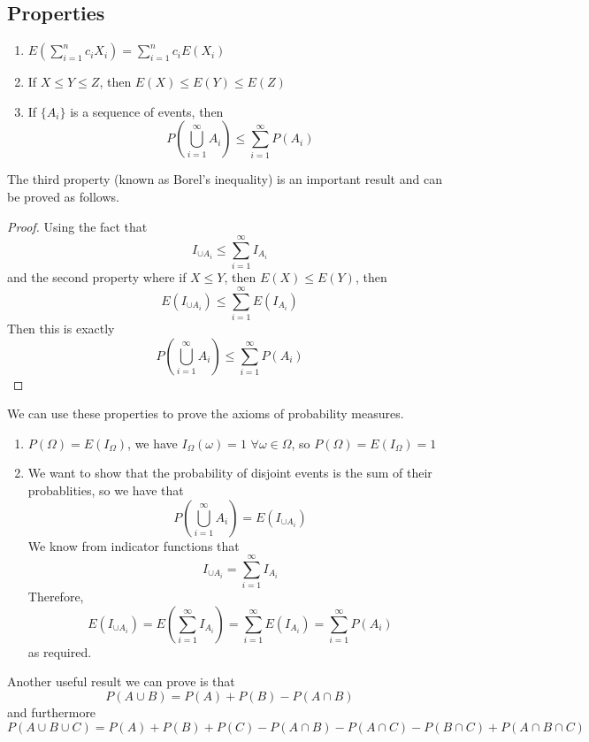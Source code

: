 \documentclass[openany]{report}
\begin{document}
\subsection{Properties}
\begin{enumerate}
    \item $E\left(\sum\limits_{i=1}^n c_iX_i\right) = \sum\limits_{i=1}^n c_iE(X_i)$
    \item If $X \leq Y \leq Z$, then $E(X) \leq E(Y) \leq E(Z)$
    \item If $\{A_i\}$ is a sequence of events, then 
    \[P\left(\bigcup_{i=1}^\infty A_i\right) \leq \sum_{i=1}^\infty P(A_i)\]
   
\end{enumerate}
The third property (known as Borel's inequality) is an important result and can be proved as follows. 
\begin{proof}
    Using the fact that 
    \[I_{\cup A_i} \leq \sum_{i=1}^\infty I_{A_i}\]
    and the second property where if $X \leq Y$, then $E(X) \leq E(Y)$, then 
    \[E\left(I_{\cup A_i}\right) \leq \sum_{i=1}^\infty E(I_{A_i})\]
    Then this is exactly 
    \[P\left(\bigcup_{i=1}^\infty A_i\right) \leq \sum_{i=1}^\infty P(A_i)\]
\end{proof}
\noindent
We can use these properties to prove the axioms of probability measures. 
\begin{enumerate}
    \item $P(\Omega) = E(I_\Omega)$, we have $I_\Omega(\omega) = 1$ $\forall \omega \in \Omega$, so $P(\Omega) = E(I_\Omega) = 1$
    \item We want to show that the probability of disjoint events is the sum of their probablities, so we have that 
    \[P\left(\bigcup_{i=1}^\infty A_i\right) = E\left(I_{\cup A_i}\right)\]
    We know from indicator functions that 
    \[I_{\cup A_i} = \sum_{i=1}^\infty I_{A_i}\]
    Therefore,
    \[E\left(I_{\cup A_i}\right) = E\left(\sum_{i=1}^\infty I_{A_i}\right) = \sum_{i=1}^\infty E(I_{A_i}) = \sum_{i=1}^\infty P(A_i)\]
    as required. 
\end{enumerate}
Another useful result we can prove is that 
\[P(A \cup B) = P(A) + P(B) - P(A \cap B)\]
 and furthermore 
 \[P(A \cup B \cup C) = P(A) + P(B) + P(C) - P(A \cap B) - P(A \cap C) - P(B \cap C) + P(A \cap B \cap C)\]
\end{document}
